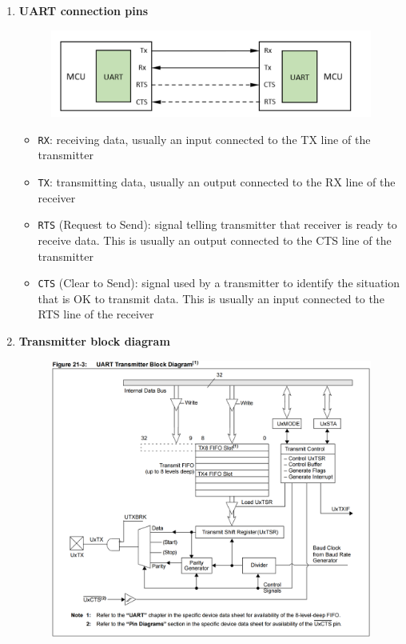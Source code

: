 \documentclass[a4paper]{article}
\begin{document}
\begin{enumerate}[label = \arabic*.]
    \item \textbf{UART connection pins}
      \begin{figure}[H]
        \centering
        \includegraphics[width=0.6\linewidth]{UART_connection_pins.jpeg}
        \label{fig:UART_connection_pins.jpeg}
      \end{figure}

      \begin{itemize}[leftmargin = 1cm]
        \item \verb|RX|: receiving data, usually an input connected to the TX line of the transmitter
        \item \verb|TX|: transmitting data, usually an output connected to the RX line of the receiver
        \item \verb|RTS| (Request to Send): signal telling transmitter that receiver is ready to receive data. This is usually an output connected to the CTS line of the transmitter
        \item \verb|CTS| (Clear to Send): signal used by a transmitter to identify the situation that is OK to transmit data. This is usually an input connected to the RTS line of the receiver
      \end{itemize}

    \item \textbf{Transmitter block diagram}
      \begin{figure}[H]
        \centering
        \includegraphics[width=0.8\linewidth]{UART_transmitter_block_diagram.png}
        \label{fig:UART_transmitter_block_diagram.png}
      \end{figure}


\end{enumerate}
\end{document}
